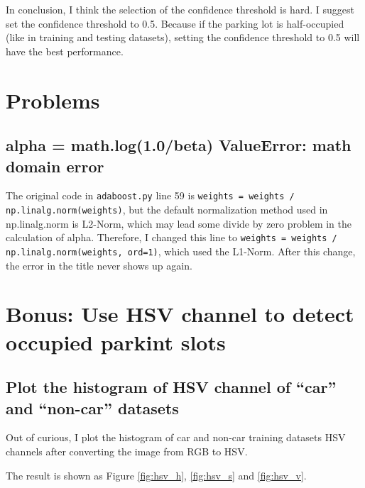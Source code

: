 \documentclass{article}[12pt]
\begin{document}
In conclusion, I think the selection of the confidence threshold is hard. I suggest set
the confidence threshold to 0.5. Because if the parking lot is half-occupied (like in training 
and testing datasets), setting the confidence threshold to 0.5 will have the best performance.


\section{Problems}
\subsection{alpha = math.log(1.0/beta) ValueError: math domain error}
The original code in \texttt{adaboost.py} line 59 is 
\texttt{weights = weights / np.linalg.norm(weights)},
but the default normalization method used in np.linalg.norm is L2-Norm, 
which may lead some divide by zero problem in the calculation of alpha.
Therefore, I changed this line to \texttt{weights = weights / np.linalg.norm(weights, ord=1)}, 
which used the L1-Norm. After this change, the error in the title never shows up again.

\section{Bonus: Use HSV channel to detect occupied parkint slots}

\subsection{Plot the histogram of HSV channel of ``car'' and ``non-car'' datasets}

Out of curious, I plot the histogram of car and non-car training datasets HSV channels after converting
the image from RGB to HSV. 

The result is shown as Figure \ref{fig:hsv_h}, \ref{fig:hsv_s} and \ref{fig:hsv_v}.
\end{document}
